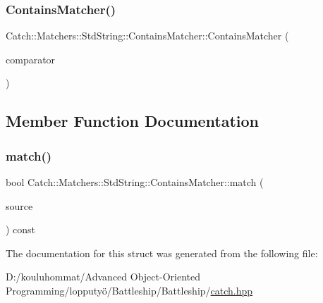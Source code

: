 \subsubsection{\texorpdfstring{Contains\+Matcher()}{ContainsMatcher()}}
{\footnotesize\ttfamily Catch\+::\+Matchers\+::\+Std\+String\+::\+Contains\+Matcher\+::\+Contains\+Matcher (\begin{DoxyParamCaption}\item[{\mbox{\hyperlink{struct_catch_1_1_matchers_1_1_std_string_1_1_cased_string}{Cased\+String}} const \&}]{comparator }\end{DoxyParamCaption})}



\subsection{Member Function Documentation}
\mbox{\label{struct_catch_1_1_matchers_1_1_std_string_1_1_contains_matcher_a630628b234b037be83fe587081a80b53}} 
\subsubsection{\texorpdfstring{match()}{match()}}
{\footnotesize\ttfamily bool Catch\+::\+Matchers\+::\+Std\+String\+::\+Contains\+Matcher\+::match (\begin{DoxyParamCaption}\item[{std\+::string const \&}]{source }\end{DoxyParamCaption}) const\hspace{0.3cm}{\ttfamily [override]}}



The documentation for this struct was generated from the following file\+:\begin{DoxyCompactItemize}
\item 
D\+:/kouluhommat/\+Advanced Object-\/\+Oriented Programming/lopputyö/\+Battleship/\+Battleship/\mbox{\hyperlink{catch_8hpp}{catch.\+hpp}}\end{DoxyCompactItemize}
